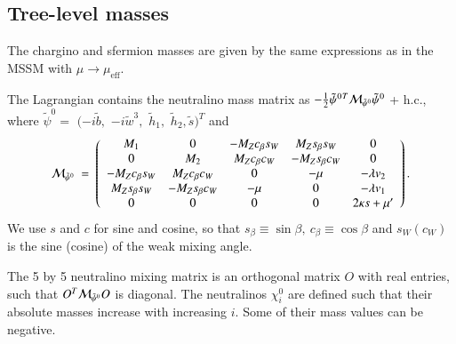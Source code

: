 \documentclass[final,3p,times,pdflatex]{elsarticle}
\newcommand{\ba}{\begin{eqnarray}}
\newcommand{\ea}{\end{eqnarray}}
\begin{document}
 

\subsection{Tree-level masses \label{sec:tree}}
The chargino and sfermion masses are given by the same expressions as in the MSSM with $\mu \rightarrow \mu_\textrm{eff}$. 

The Lagrangian contains the neutralino mass matrix as
$-\frac{1}{2}
{\tilde\psi^0}{}^T{\cal M}_{\tilde\psi^0}\tilde\psi^0$ + h.c., where
$\tilde\psi^0 =$ $(-i\tilde b,$ $-i\tilde w^3,$ $\tilde h_1,$ $\tilde
h_2, \tilde{s})^T$ and
\begin{equation}
{\cal M}_{\tilde\psi^0} \ =\ \left(\begin{array}{ccccc} 
M_1 & 0 &-M_Zc_\beta s_W & M_Zs_\beta s_W & 0 \\
 0 & M_2 & M_Zc_\beta c_W & -M_Zs_\beta c_W & 0 \\ 
-M_Zc_\beta s_W & M_Zc_\beta c_W & 0 & -\mu & -\lambda v_2 \\
M_Zs_\beta s_W & -M_Zs_\beta c_W & -\mu & 0 & - \lambda v_1 \\
0 & 0 & 0 & 0 & 2 \kappa s + \mu^\prime
\end{array} \right). \label{mchi0}
\end{equation} 
We use $s$ and $c$ for sine and cosine, so that
$s_\beta\equiv\sin\beta,\ c_{\beta}\equiv\cos\beta$ and $s_W (c_W)$ is
the sine (cosine) of the weak mixing angle.  

The 5 by 5 neutralino mixing matrix is an orthogonal matrix $O$ with real
entries,  such that $O^T {\cal M}_{\tilde\psi^0} O$ is diagonal.
The neutralinos $\chi^0_i$ are defined such that their absolute masses
increase with increasing $i$. Some of their mass values can be negative. 
\end{document}
